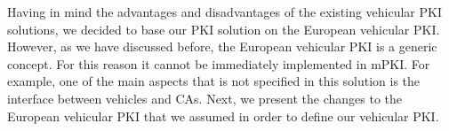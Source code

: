 Having in mind the advantages and disadvantages of the existing vehicular PKI solutions, we decided to base our PKI solution on the European vehicular PKI. However, as we have discussed before, the European vehicular PKI is a generic concept. For this reason it cannot be immediately implemented in mPKI. For example, one of the main aspects that is not specified in this solution is the interface between vehicles and CAs. Next, we present the changes to the European vehicular PKI that we assumed in order to define our vehicular PKI.